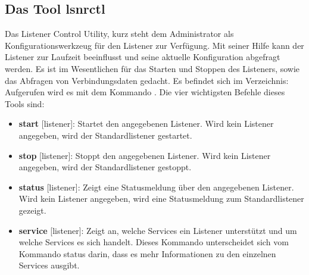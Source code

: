       \subsection{Das Tool lsnrctl}
        \label{lsnrctl}
        Das Listener Control Utility, kurz  steht dem Administrator als Konfigurationswerkzeug für den Listener zur Verfügung. Mit seiner Hilfe kann der Listener zur Laufzeit beeinflusst und seine aktuelle Konfiguration abgefragt werden. Es ist im Wesentlichen für das Starten und Stoppen des Listeners, sowie das Abfragen von Verbindungsdaten gedacht. Es befindet sich im Verzeichnis: 
\clearpage
        Aufgerufen wird es mit dem Kommando . Die vier
        wichtigsten Befehle dieses Tools sind:
        \begin{itemize}
          \item \textbf{start} [listener]: Startet den angegebenen Listener.
          Wird kein Listener angegeben, wird der Standardlistener
           gestartet.
          \item \textbf{stop} [listener]: Stoppt den angegebenen Listener. Wird
          kein Listener angegeben, wird der Standardlistener
           gestoppt.
          \item \textbf{status} [listener]: Zeigt eine Statusmeldung über den
          angegebenen Listener. Wird kein Listener angegeben, wird
          eine Statusmeldung zum Standardlistener  gezeigt.
          \item \textbf{service} [listener]: Zeigt an, welche Services ein
          Listener unterstützt und um welche Services es sich handelt. Dieses
          Kommando unterscheidet sich vom Kommando status darin, dass es mehr
          Informationen zu den einzelnen Services ausgibt.
        \end{itemize}

        \begin{literaturinternet}
          \item \cite{i486171}
        \end{literaturinternet}
